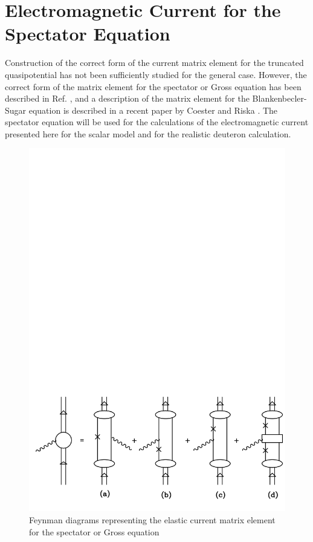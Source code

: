 \documentclass[mythesis.tex]{subfiles}
\begin{document}
\section{Electromagnetic Current for the Spectator Equation}

Construction of the correct form of the current matrix element for the
truncated quasipotential has not been sufficiently studied for the general
case. However, the correct form of the matrix element for the spectator or
Gross equation has been described in Ref. \cite{GrossandRiska}, and a
description of the
matrix element for the Blankenbecler-Sugar equation is described in a
recent paper by Coester and Riska \cite{CoesterandRiska}. The spectator
equation will be
used for the calculations of the electromagnetic current presented here for
the scalar model and for the realistic deuteron calculation.

\begin{figure}
\centerline{\includegraphics[width=5in]{graphics/new/gcrrntme.pdf}}
\caption{Feynman diagrams representing the elastic current matrix
element for the spectator or Gross equation}\label{Gcurrent}
\end{figure}
\end{document}
